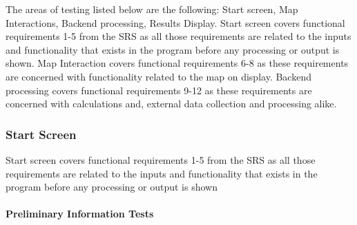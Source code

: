 \documentclass[12pt, titlepage]{article}
\begin{document}
The areas of testing listed below are the following: Start screen, Map Interactions, 
Backend processing, Results Display. Start screen covers functional requirements 1-5 
from the SRS as all those requirements are related to the inputs and functionality that 
exists in the program before any processing or output is shown. Map Interaction covers 
functional requirements 6-8 as these requirements are concerned with functionality related 
to the map on display. Backend processing covers functional requirements 9-12 as these 
requirements are concerned with calculations and, external data collection and processing 
alike.

\subsubsection{Start Screen}

Start screen covers functional requirements 1-5 from the SRS as all those requirements 
are related to the inputs and functionality that exists in the program before any 
processing or output is shown
		
\paragraph{Preliminary Information Tests} \label{PIT}
\end{document}
